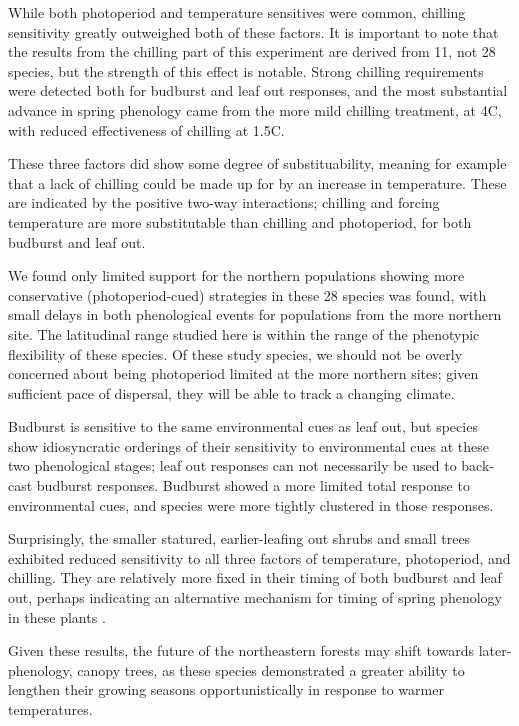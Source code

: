 \documentclass[11pt]{article}
\begin{document}
While both photoperiod and temperature sensitives were common, chilling sensitivity greatly outweighed both of these factors. It is important to note that the results from the chilling part of this experiment are derived from 11, not 28 species, but the strength of this effect is notable. Strong chilling requirements were detected both for budburst and leaf out responses, and the most substantial advance in spring phenology came from the more mild chilling treatment, at 4\degree C, with reduced effectiveness of chilling at 1.5\degree C. 

These three factors did show some degree of substituability, meaning for example that a lack of chilling could be made up for by an increase in temperature. These are indicated by the positive two-way interactions; chilling and forcing temperature are more substitutable than chilling and photoperiod, for both budburst and leaf out.

We found only limited support for the northern populations showing more conservative (photoperiod-cued) strategies in these 28 species was found, with small delays in both phenological events for populations from the more northern site. The latitudinal range studied here is within the range of the phenotypic flexibility of these species. Of these study species, we should not be overly concerned about being photoperiod limited at the more northern sites; given sufficient pace of dispersal, they will be able to track a changing climate.

Budburst is sensitive to the same environmental cues as leaf out, but species show idiosyncratic orderings of their sensitivity to environmental cues at these two phenological stages; leaf out responses can not necessarily be used to back-cast budburst responses. Budburst showed a more limited total response to environmental cues, and species were more tightly clustered in those responses.

Surprisingly, the smaller statured, earlier-leafing out shrubs and small trees exhibited reduced sensitivity to all three factors of temperature, photoperiod, and chilling. They are relatively more fixed in their timing of both budburst and leaf out, perhaps indicating an alternative mechanism for timing of spring phenology in these plants \cite{Pagter:2015}.

Given these results, the future of the northeastern forests may shift towards later-phenology, canopy trees, as these species demonstrated a greater ability to lengthen their growing seasons opportunistically in response to warmer temperatures.
\end{document}
